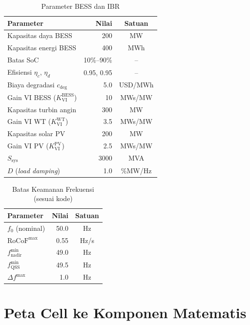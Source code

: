 \documentclass[journal]{IEEEtran}
\newcommand{\RoCoF}{\mathrm{RoCoF}}
\begin{document}
\begin{table}[!t]\renewcommand{\arraystretch}{1.2}
\caption{Parameter BESS dan IBR}
\label{tab:ibr}
\centering\footnotesize
\begin{tabular}{lrc}
\toprule
Parameter & Nilai & Satuan \\ \midrule
Kapasitas daya BESS & 200 & MW \\
Kapasitas energi BESS & 400 & MWh \\
Batas SoC & 10\%--90\% & -- \\
Efisiensi $\eta_c$, $\eta_d$ & 0.95, 0.95 & -- \\
Biaya degradasi $c_{\mathrm{deg}}$ & 5.0 & USD/MWh \\
Gain VI BESS ($K_{\mathrm{VI}}^{\mathrm{BESS}}$) & 10 & MWs/MW \\
Kapasitas turbin angin & 300 & MW \\
Gain VI WT ($K_{\mathrm{VI}}^{\mathrm{WT}}$) & 3.5 & MWs/MW \\
Kapasitas solar PV & 200 & MW \\
Gain VI PV ($K_{\mathrm{VI}}^{\mathrm{PV}}$) & 2.5 & MWs/MW \\
$S_{\mathrm{sys}}$ & 3000 & MVA \\
$D$ (\textit{load damping}) & 1.0 & \%MW/Hz \\
\bottomrule
\end{tabular}
\end{table}

\begin{table}[!t]\renewcommand{\arraystretch}{1.2}
\caption{Batas Keamanan Frekuensi (sesuai kode)}
\label{tab:freq}
\centering\footnotesize
\begin{tabular}{lrc}
\toprule
Parameter & Nilai & Satuan \\ \midrule
$f_0$ (nominal) & 50.0 & Hz \\
$\RoCoF^{\max}$ & 0.55 & Hz/s \\
$f_{\mathrm{nadir}}^{\min}$ & 49.0 & Hz \\
$f_{\mathrm{QSS}}^{\min}$ & 49.5 & Hz \\
$\Delta f^{\max}$ & 1.0 & Hz \\
\bottomrule
\end{tabular}
\end{table}

\section{Peta Cell ke Komponen Matematis}
\label{sec:flow}
\end{document}
